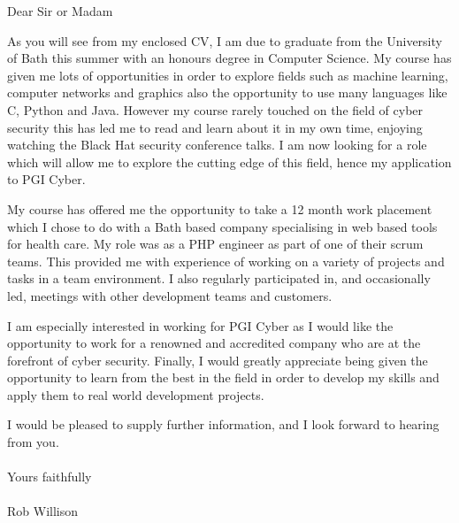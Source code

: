 \documentclass{letter}
\begin{document}
\begin{letter}{}
\vspace*{-10\baselineskip}
\fontsize{12pt}{14pt}\selectfont
\opening{Dear Sir or Madam}

As you will see from my enclosed CV, I am due to graduate from the University of Bath
this summer with an honours degree in Computer Science. My course has given me lots of
opportunities in order to explore fields such as machine learning, computer networks and graphics
also the opportunity to use many languages like C, Python and Java. However my course rarely touched on the field
of cyber security this has led me to read and learn about it in my own time, enjoying watching the Black Hat
security conference talks. I am now looking for a role which will allow me to explore the
cutting edge of this field, hence my application to PGI Cyber.

My course has offered me the opportunity to take a 12 month work placement which I chose to do
with a Bath based company specialising in web based tools for health care. My role was
as a PHP engineer as part of one of their scrum teams. This provided me with experience of working on a variety of
projects and tasks in a team environment. I also regularly participated in, and occasionally led,
meetings with other development teams and customers.

I am especially interested in working for PGI Cyber as I would like the opportunity to work for
a renowned and accredited company who are at the forefront of cyber security.
Finally, I would greatly appreciate being given the opportunity to learn from the best in the field in order to
develop my skills and apply them to real world development projects.

I would be pleased to supply further information, and I look forward to hearing from you.
\\~\\
Yours faithfully
\\~\\
Rob Willison

\end{letter}
\end{document}

